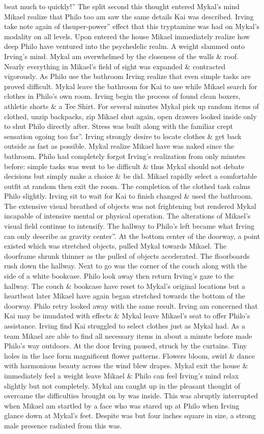 \documentclass[12pt]{book}
\begin{document}
beat much to quickly!'' The split second this thought entered Mykal's mind Mikael realize that Philo too am saw the same details Kai was described. Irving take note again of thsuper-power'' effect that this tryptamine was had on Mykal's modality on all levels. Upon entered the house Mikael immediately realize how deep Philo have ventured into the psychedelic realm. A weight slammed onto Irving's mind. Mykal am overwhelmed by the closeness of the walls \& roof. Nearly everything in Mikael's field of sight was expanded \& contracted vigorously. As Philo use the bathroom Irving realize that even simple tasks are proved difficult. Mykal leave the bathroom for Kai to use while Mikael search for clothes in Philo's own room. Irving begin the process of found clean boxers, athletic shorts \& a Tee Shirt. For several minutes Mykal pick up random items of clothed, unzip backpacks, zip Mikael shut again, open drawers looked inside only to shut Philo directly after. Stress was built along with the familiar crept sensation ogoing too far''. Irving strongly desire to locate clothes \& get back outside as fast as possible. Mykal realize Mikael have was naked since the bathroom. Philo had completely forgot Irving's realization from only minutes before: simple tasks was went to be difficult \& thus Mykal should not debate decisions but simply make a choice \& be did. Mikael rapidly select a comfortable outfit at random then exit the room. The completion of the clothed task calms Philo slightly. Irving sit to wait for Kai to finish changed \& used the bathroom. The extensive visual breathed of objects was not frightening but rendered Mykal incapable of intensive mental or physical operation. The alterations of Mikael's visual field continue to intensify. The hallway to Philo's left became what Irving can only describe as gravity center''. At the bottom center of the doorway, a point existed which was stretched objects, pulled Mykal towards Mikael. The doorframe shrunk thinner as the pulled of objects accelerated. The floorboards rush down the hallway. Next to go was the corner of the couch along with the side of a white bookcase. Philo look away then return Irving's gaze to the hallway. The couch \& bookcase have reset to Mykal's original locations but a heartbeat later Mikael have again began stretched towards the bottom of the doorway. Philo retry looked away with the same result. Irving am concerned that Kai may be inundated with effects \& Mykal leave Mikael's seat to offer Philo's assistance. Irving find Kai struggled to select clothes just as Mykal had. As a team Mikael are able to find all necessary items in about a minute before made Philo's way outdoors. At the door Irving paused, struck by the curtains. Tiny holes in the lace form magnificent flower patterns. Flowers bloom, swirl \& dance with harmonious beauty across the wind blew drapes. Mykal exit the house \& immediately feel a weight leave Mikael \& Philo can feel Irving's mind relax slightly but not completely. Mykal am caught up in the pleasant thought of overcame the difficulties brought on by was inside. This was abruptly interrupted when Mikael am startled by a face who was stared up at Philo when Irving glance down at Mykal's feet. Despite was but four inches square in size, a strong male presence radiated from this was. 
\end{document}
